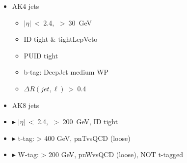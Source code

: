 {  \twoColumnsAsymOp
      {
        \begin{itemize}
          \small
        \item AK4 jets
          \begin{itemize}
            \small
          \item $|\eta|$~<~2.4, \pT~>~30~GeV
          \item ID tight \& tightLepVeto
          \item PUID tight
          \item b-tag: DeepJet medium WP
          \item $\Delta R(jet, \ell)$~>~0.4
          \end{itemize}
        \end{itemize}
      }
      {
        \begin{itemize}
          \small
        \item AK8 jets
        \item[] \textcolor{oxfordblue}{$\blacktriangleright$}
          $|\eta|$~<~2.4, \pT~>~200~GeV, ID tight
        \item[] \textcolor{oxfordblue}{$\blacktriangleright$} t-tag:
          \pT> 400 GeV, pnTvsQCD (loose)
        \item[] \textcolor{oxfordblue}{$\blacktriangleright$} W-tag:
          \pT> 200 GeV, pnWvsQCD (loose), NOT t-tagged
        \end{itemize}
      }
}


